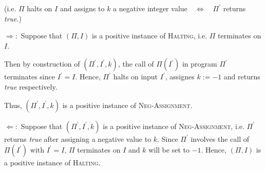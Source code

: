 (i.e. $\Pi $ halts on $I$ and assigns to $k$ a negative integer value$\quad
\Leftrightarrow\quad \Pi^{\prime }$ returns \textit{true}.)

$\Rightarrow :$ Suppose that $\left( \Pi ,I\right) $ is a positive instance
of \textsc{Halting}, i.e. $\Pi $ terminates on $I$.

Then by construction of $(\Pi ^{\prime },I^{\prime },k)$, the call of $\Pi
(I^{\prime })$ in program $\Pi ^{\prime }$ terminates since $I^{\prime }=I$.
Hence, $\Pi ^{\prime }$ halts on input $I^{\prime }$, assignes $k:=-1$ and
returns \textit{true} respectively.

Thus, $(\Pi ^{\prime },I^{\prime },k)$ is a positive instance of \textsc{%
Neg-Assignment}.

\bigskip

$\Leftarrow :$ Suppose that $\left( \Pi ^{\prime },I^{\prime },k\right) $ is
a positive instance of \textsc{Neg-Assignment}, i.e. $\Pi ^{\prime }$
returns \textit{true} after assigning a negative value to $k$. Since $\Pi
^{\prime }$ involves the call of $\Pi (I^{\prime })$ with $I^{\prime }=I$, $%
\Pi $ terminates on $I$ and $k$ will be set to $-1$. Hence, $(\Pi ,I)$ is a
positive instance of \textsc{Halting}.

\bigskip
